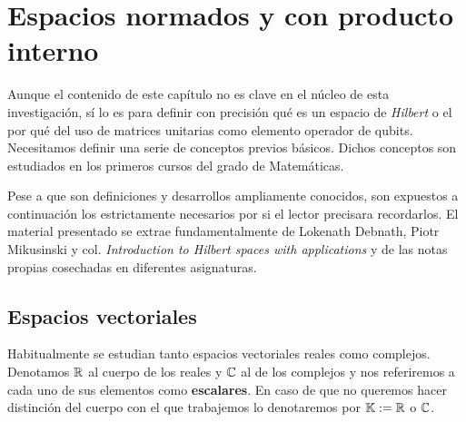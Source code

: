 \chapter{Espacios normados y con producto interno}
\label{chapter2}

Aunque el contenido de este capítulo no es clave en el núcleo de esta investigación, sí lo es para definir con precisión qué es un espacio de \textit{Hilbert} o el por qué del uso de matrices unitarias como elemento operador de qubits. Necesitamos definir una serie de conceptos previos básicos. Dichos conceptos son estudiados en los primeros cursos del grado de Matemáticas.

Pese a que son definiciones y desarrollos ampliamente conocidos, son expuestos a continuación los estrictamente necesarios por si el lector precisara recordarlos. El material presentado se extrae fundamentalmente de Lokenath Debnath, Piotr Mikusinski y col. \textit{Introduction to Hilbert spaces with applications} y de las notas propias cosechadas en diferentes asignaturas.

\section{Espacios vectoriales}

Habitualmente se estudian tanto espacios vectoriales reales como complejos. Denotamos $\mathbb{R}$ al cuerpo de los reales y $\mathbb{C}$ al de los complejos y nos referiremos a cada uno de sus elementos como \textbf{escalares}. En caso de que no queremos hacer distinción del cuerpo con el que trabajemos lo denotaremos por $\mathbb{K}:=\mathbb{R}$ o $\mathbb{C}$.

